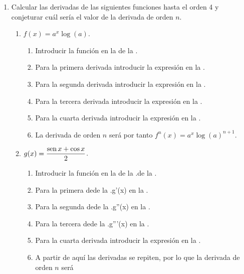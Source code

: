 \begin{enumerate}[leftmargin=*]
\item  Calcular las derivadas de las siguientes funciones hasta el orden 4 y conjeturar cuál sería el valor de la derivada de orden $n$.
      \begin{enumerate}
      \item  $f(x)=a^x\log(a)$.
            \begin{indication}
            \begin{enumerate}
            \item Introducir la función  en la  de la .
            \item Para la primera derivada introducir la expresión  en la .
            \item Para la segunda derivada introducir la expresión  en la .
            \item Para la tercera derivada introducir la expresión  en la .
            \item Para la cuarta derivada introducir la expresión  en la .
            \item La derivada de orden $n$ será por tanto $f^n(x)=a^x\log(a)^{n+1}$.
            \end{enumerate}
            \end{indication}
      \item  $g(x)=\dfrac{\operatorname{sen} x +\cos x}{2}$.
            \begin{indication}
            \begin{enumerate}
            \item Introducir la función  en la  de la .de la .
            \item Para la primera dede la .{g'(x)} en la .
            \item Para la segunda dede la .{g''(x)} en la .
            \item Para la tercera dede la .{g'''(x)} en la .
            \item Para la cuarta derivada introducir la expresión  en la .
            \item A partir de aquí las derivadas se repiten, por lo que la derivada de orden $n$ será

\end{enumerate}
\end{indication}
\end{enumerate}
\end{enumerate}
